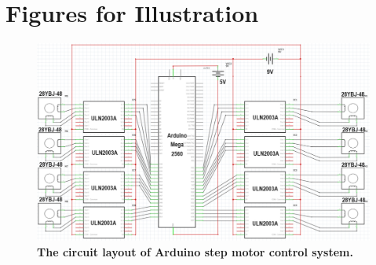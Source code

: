 \chapter{Figures for Illustration}
\label{append:figures}

\begin{landscape}
    \begin{figure}[H] %
        \centering 
        \captionsetup{labelsep=colon}
        \includegraphics[width=1.5\textwidth]{Image/Design/arduino_circuit_layout.png} 
        \caption[The circuit layout of Arduino step motor control system]
        {\centering \textbf{The circuit layout of Arduino step motor control system.}}
        \label{fig:motor_circuit_layout}
    \end{figure}
\end{landscape}
\newpage
